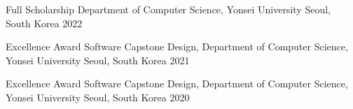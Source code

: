 


\begin{cvhonors}

  \cvhonor
    {Full Scholarship} %
    {Department of Computer Science, Yonsei University} %
    {Seoul, South Korea} %
    {2022} %

  \cvhonor
    {Excellence Award} %
    {Software Capstone Design, Department of Computer Science, Yonsei University} %
    {Seoul, South Korea} %
    {2021} %

  \cvhonor
    {Excellence Award} %
    {Software Capstone Design, Department of Computer Science, Yonsei University} %
    {Seoul, South Korea} %
    {2020} %

\end{cvhonors}

